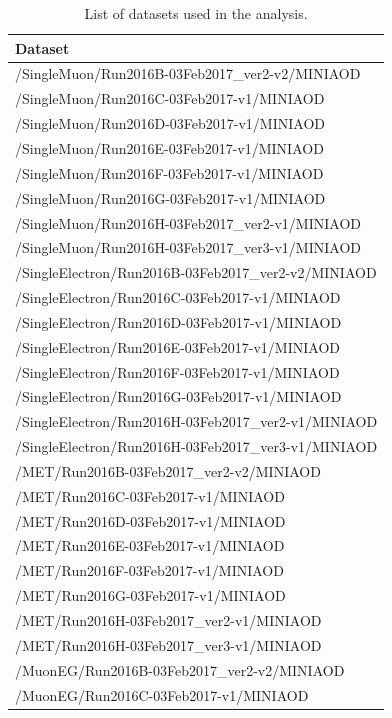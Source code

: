 \begin{table}[htbp]
\centering
\caption{List of datasets used in the analysis.}
\label{tab:stop:datasets}
\begin{tabular}{l}
\hline
Dataset \\
\hline
  /SingleMuon/Run2016B-03Feb2017\_ver2-v2/MINIAOD \\
  /SingleMuon/Run2016C-03Feb2017-v1/MINIAOD \\
  /SingleMuon/Run2016D-03Feb2017-v1/MINIAOD \\
  /SingleMuon/Run2016E-03Feb2017-v1/MINIAOD \\
  /SingleMuon/Run2016F-03Feb2017-v1/MINIAOD \\
  /SingleMuon/Run2016G-03Feb2017-v1/MINIAOD \\
  /SingleMuon/Run2016H-03Feb2017\_ver2-v1/MINIAOD \\
  /SingleMuon/Run2016H-03Feb2017\_ver3-v1/MINIAOD \\
\hline
  /SingleElectron/Run2016B-03Feb2017\_ver2-v2/MINIAOD \\
  /SingleElectron/Run2016C-03Feb2017-v1/MINIAOD \\
  /SingleElectron/Run2016D-03Feb2017-v1/MINIAOD \\
  /SingleElectron/Run2016E-03Feb2017-v1/MINIAOD \\
  /SingleElectron/Run2016F-03Feb2017-v1/MINIAOD \\
  /SingleElectron/Run2016G-03Feb2017-v1/MINIAOD \\
  /SingleElectron/Run2016H-03Feb2017\_ver2-v1/MINIAOD \\
  /SingleElectron/Run2016H-03Feb2017\_ver3-v1/MINIAOD \\
\hline
  /MET/Run2016B-03Feb2017\_ver2-v2/MINIAOD \\
  /MET/Run2016C-03Feb2017-v1/MINIAOD \\
  /MET/Run2016D-03Feb2017-v1/MINIAOD \\
  /MET/Run2016E-03Feb2017-v1/MINIAOD \\
  /MET/Run2016F-03Feb2017-v1/MINIAOD \\
  /MET/Run2016G-03Feb2017-v1/MINIAOD \\
  /MET/Run2016H-03Feb2017\_ver2-v1/MINIAOD \\
  /MET/Run2016H-03Feb2017\_ver3-v1/MINIAOD \\
\hline
  /MuonEG/Run2016B-03Feb2017\_ver2-v2/MINIAOD \\
  /MuonEG/Run2016C-03Feb2017-v1/MINIAOD \\

\end{tabular}
\end{table}
